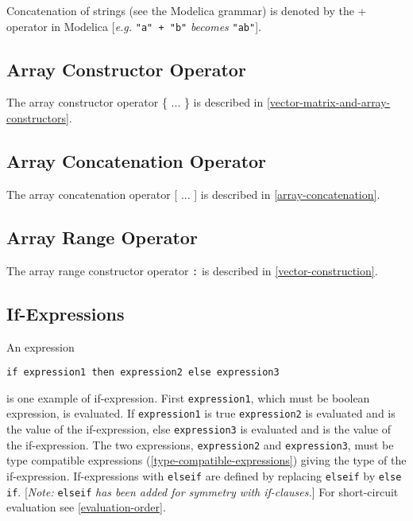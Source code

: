 Concatenation of strings (see the Modelica grammar) is denoted by the +
operator in Modelica {[}\emph{e.g.} \lstinline!"a" + "b"! \emph{becomes} \lstinline!"ab"!{]}.

\subsection{Array Constructor Operator}

The array constructor operator \{ ... \} is described in \autoref{vector-matrix-and-array-constructors}.

\subsection{Array Concatenation Operator}

The array concatenation operator {[} ... {]} is described in \autoref{array-concatenation}.

\subsection{Array Range Operator}

The array range constructor operator \lstinline!:! is described in \autoref{vector-construction}.

\subsection{If-Expressions}

An expression
\begin{lstlisting}[language=modelica]
if expression1 then expression2 else expression3
\end{lstlisting}

is one example of if-expression. First \lstinline!expression1!, which must be
boolean expression, is evaluated. If \lstinline!expression1! is true \lstinline!expression2! is
evaluated and is the value of the if-expression, else \lstinline!expression3! is
evaluated and is the value of the if-expression. The two expressions,
\lstinline!expression2! and \lstinline!expression3!, must be type compatible expressions
(\autoref{type-compatible-expressions}) giving the type of the if-expression. If-expressions with
\lstinline!elseif! are defined by replacing \lstinline!elseif! by \lstinline!else if!. {[}\emph{Note:}
\lstinline!elseif! \emph{has been added for symmetry with if-clauses.}{]} For
short-circuit evaluation see \autoref{evaluation-order}.

